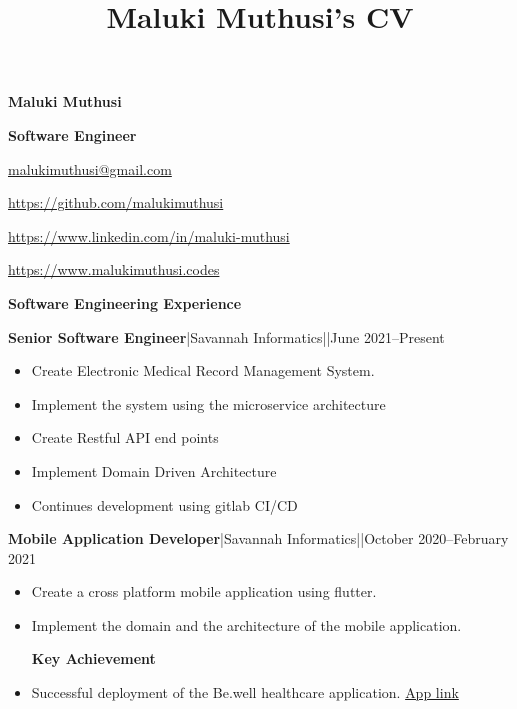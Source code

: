 \documentclass[a4paper]{article}
\begin{document}
\title{Maluki Muthusi's CV}

\begin{center}
    {\Large \textbf{Maluki Muthusi}} \par

    {\large \textbf{Software Engineer}}
\end{center}

\begin{description}[noitemsep]
    \item[\textbf{Email:}] \href{mailto:malukimuthusi@gmail.com}{malukimuthusi@gmail.com}
    \item[\textbf{Github:}] \url{https://github.com/malukimuthusi}
        \item[\textbf{LinkedIn:}]\url{https://www.linkedin.com/in/maluki-muthusi}
        \item[\textbf{Website:}]\url{https://www.malukimuthusi.codes}
\end{description}


\begin{center}
    {\Large \textbf{Software Engineering Experience}}
\end{center}

\textbf{Senior Software Engineer}|Savannah Informatics||June 2021--Present

\begin{itemize}[noitemsep]
    \item Create Electronic Medical Record Management System.
    \item Implement the system using the microservice architecture
    \item Create Restful API end points
    \item Implement Domain Driven Architecture
    \item Continues development using gitlab CI/CD
\end{itemize}

\textbf{Mobile Application Developer}|Savannah Informatics||October 2020--February 2021

\begin{itemize}[noitemsep]
    \item Create a cross platform mobile application using flutter.
    \item Implement the domain and the architecture of the mobile application.
          \begin{center}
              \textbf{Key Achievement}
          \end{center}
    \item Successful deployment of the Be.well healthcare application. \href{https://play.google.com/store/apps/details?id=com.savannah.bewell}{App link}
\end{itemize}
\end{document}
